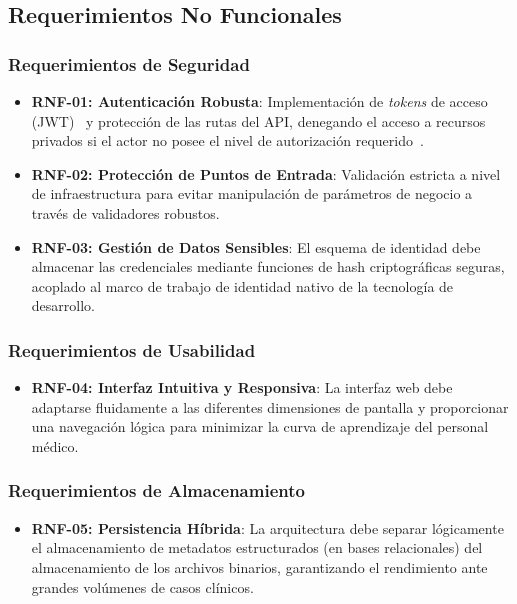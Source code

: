 \subsection{Requerimientos No Funcionales}
\subsubsection{Requerimientos de Seguridad}

\begin{itemize}
    \item \textbf{RNF-01: Autenticación Robusta}: Implementación de \textit{tokens} de acceso (JWT)~\cite{rfc7519_jwt} y protección de las 
    rutas del API, denegando el acceso a recursos privados si el actor no posee el nivel de autorización 
    requerido~\cite{owasp_secure_default}.
    \item \textbf{RNF-02: Protección de Puntos de Entrada}: Validación estricta a nivel de infraestructura para 
    evitar manipulación de parámetros de negocio a través de validadores robustos.
    \item \textbf{RNF-03: Gestión de Datos Sensibles}: El esquema de identidad debe almacenar las credenciales 
    mediante funciones de hash criptográficas seguras, acoplado al marco de trabajo de identidad nativo 
    de la tecnología de desarrollo.
\end{itemize}

\subsubsection{Requerimientos de Usabilidad}
\begin{itemize}
    \item \textbf{RNF-04: Interfaz Intuitiva y Responsiva}: La interfaz web debe adaptarse fluidamente a las 
    diferentes dimensiones de pantalla y proporcionar una navegación lógica para minimizar la curva 
    de aprendizaje del personal médico.
\end{itemize}

\subsubsection{Requerimientos de Almacenamiento}
\begin{itemize}
    \item \textbf{RNF-05: Persistencia Híbrida}: La arquitectura debe separar lógicamente el almacenamiento de 
    metadatos estructurados (en bases relacionales) del almacenamiento de los archivos binarios, 
    garantizando el rendimiento ante grandes volúmenes de casos clínicos.
\end{itemize}


